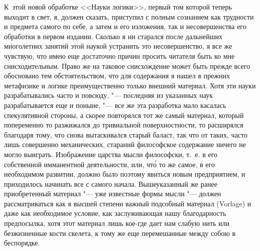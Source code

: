 К~этой новой обработке <<Науки логики>>, первый том которой теперь выходит в
свет, я, должен сказать, приступил с полным сознанием как трудности и предмета
самого по себе, а затем и его изложения, так и несовершенства его обработки в
первом издании. Сколько я ни старался после дальнейших многолетних занятий этой
наукой устранить это несовершенство, я все же чувствую, что имею еще достаточно
причин просить читателя быть ко мне снисходительным. Право же на таковое
снисхождение может быть прежде всего обосновано тем обстоятельством, что для
содержания я нашел в прежних метафизике и логике преимущественно только внешний
материал. Хотя эти науки разрабатывались часто и повсюду, "--- последняя из
указанных наук разрабатывается еще и поныне, "--- все же эта разработка мало
касалась спекулятивной стороны, а скорее повторялся тот же самый материал,
который попеременно то разжижался до тривиальной поверхностности, то расширялся
благодаря тому, что снова вытаскивался старый баласт, так что от таких, часто
лишь совершенно механических, стараний философское содержание ничего не могло
выиграть. Изображение царства мысли философски, т.~е. в его собственной
имманентной деятельности, или, чт\'{о} то же самое, в его необходимом развитии,
должно было поэтому явиться новым предприятием, и приходилось начинать все с
самого начала. Вышеуказанный же ранее приобретенный материал "--- уже известные
формы мысли "--- должен рассматриваться как в высшей степени важный подсобный
материал (Vorlage) и даже как необходимое условие, как заслуживающая нашу
благодарность предпосылка, хотя этот материал лишь кое-где дает нам слабую нить
или безжизненные кости скелета, к тому же еще перемешанные между собою в
беспорядке.

